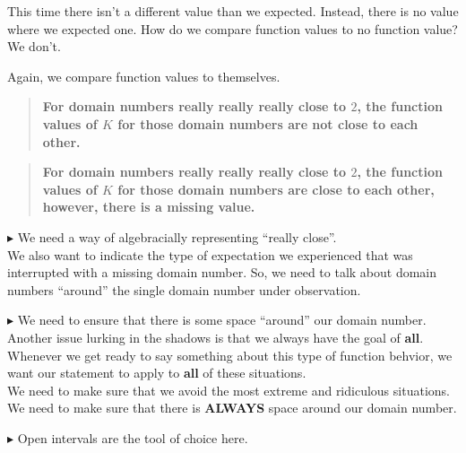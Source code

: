 \documentclass{ximera}
\begin{document}
This time there isn't a different value than we expected.  Instead, there is no value where we expected one. How do we compare function values to no function value? \\

We don't.

Again, we compare function values to themselves. \\


\begin{quote}
 \textbf{\textcolor{blue!55!black}{For domain numbers really really really close to $2$, the function values of $K$ for those domain numbers are not close to each other.}} 
\end{quote}


\begin{quote}
 \textbf{\textcolor{blue!55!black}{For domain numbers really really really close to $2$, the function values of $K$ for those domain numbers are close to each other, however, there is a missing value.}} 
\end{quote}




\textbf{\textcolor{red!90!darkgray}{$\blacktriangleright$}} We need a way of algebracially representing ``really close''.  \\


We also want to indicate the type of expectation we experienced that was interrupted with a missing domain number. So, we need to talk about domain numbers ``around'' the single domain number under observation. 


\textbf{\textcolor{red!90!darkgray}{$\blacktriangleright$}} We need to ensure that there is some space ``around'' our domain number. \\





Another issue lurking in the shadows is that we always have the goal of \textbf{\textcolor{red!80!black}{all}}. Whenever we get ready to say something about this type of function behvior, we want our statement to apply to \textbf{\textcolor{red!80!black}{all}} of these situations. \\

We need to make sure that we avoid the most extreme and ridiculous situations.  We need to make sure that there is \textbf{\textcolor{red!80!black}{ALWAYS}} space around our domain number.




$\blacktriangleright$ Open intervals are the tool of choice here.
\end{document}
